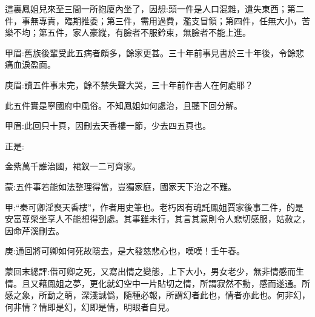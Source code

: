 \begin{parag}
    這裏鳳姐兒來至三間一所抱廈內坐了，因想:頭一件是人口混雜，遺失東西；第二件，事無專責，臨期推委；第三件，需用過費，濫支冒領；第四件，任無大小，苦樂不均；第五件，家人豪縱，有臉者不服鈐束，無臉者不能上進。\begin{note}甲眉:舊族後輩受此五病者頗多，餘家更甚。三十年前事見書於三十年後，令餘悲痛血淚盈面。\end{note}\begin{note}庚眉:讀五件事未完，餘不禁失聲大哭，三十年前作書人在何處耶？\end{note}此五件實是寧國府中風俗。不知鳳姐如何處治，且聽下回分解。\begin{note}甲眉:此回只十頁，因刪去天香樓一節，少去四五頁也。\end{note}
\end{parag}


\begin{parag}
    正是:
\end{parag}


\begin{poem}
    \begin{pl} 金紫萬千誰治國，裙釵一二可齊家。\end{pl}
    \begin{note}蒙:五件事若能如法整理得當，豈獨家庭，國家天下治之不難。\end{note}
\end{poem}


\begin{parag}
    \begin{note}甲:“秦可卿淫喪天香樓”，作者用史筆也。老朽因有魂託鳳姐賈家後事二件，的是安富尊榮坐享人不能想得到處。其事雖未行，其言其意則令人悲切感服，姑赦之，因命芹溪刪去。\end{note}
\end{parag}


\begin{parag}
    \begin{note}庚:通回將可卿如何死故隱去，是大發慈悲心也，嘆嘆！壬午春。\end{note}
\end{parag}


\begin{parag}
    \begin{note}蒙回末總評:借可卿之死，又寫出情之變態，上下大小，男女老少，無非情感而生情。且又藉鳳姐之夢，更化就幻空中一片貼切之情，所謂寂然不動，感而遂通。所感之象，所動之萌，深淺誠僞，隨種必報，所謂幻者此也，情者亦此也。何非幻，何非情？情即是幻，幻即是情，明眼者自見。\end{note}
\end{parag}

